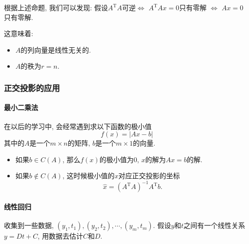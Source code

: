 根据上述命题, 我们可以发现: 假设$A^{\mathrm{T}}A$可逆$\iff$ $A^{\mathrm{T}}Ax = 0$只有零解 $\iff$ $Ax =0 $只有零解.

这意味着:
\begin{itemize}
    \item $A$的列向量是线性无关的.
    
    \item $A$的秩为$r = n$. 
\end{itemize}

\subsubsection{正交投影的应用}
\paragraph{最小二乘法}
在以后的学习中, 会经常遇到求以下函数的极小值
\begin{equation}
  f(x) = \left| Ax - b \right|
\end{equation}
其中的$A$是一个$m \times n$的矩阵, $b$是一个$m \times 1$的向量.
\begin{itemize}
    \item 如果$b \in C(A)$, 那么$f(x)$的极小值为$0$, $x$的解为$A x = b$的解.
    \item 如果$b \notin C(A)$, 这时候极小值的$x$对应正交投影的坐标
    \begin{equation}
      \hat{x} = \left( A^{\mathrm{T}}A \right) ^{-1} A^{\mathrm{T}} b.
    \end{equation}
\end{itemize}

\paragraph{线性回归}
收集到一些数据, $(y_1,t_1), (y_2,t_2) , \cdots, (y_m, t_m)$. 假设$y$和$t$之间有一个线性关系$y = Dt +C$, 用数据去估计$C$和$D$.

